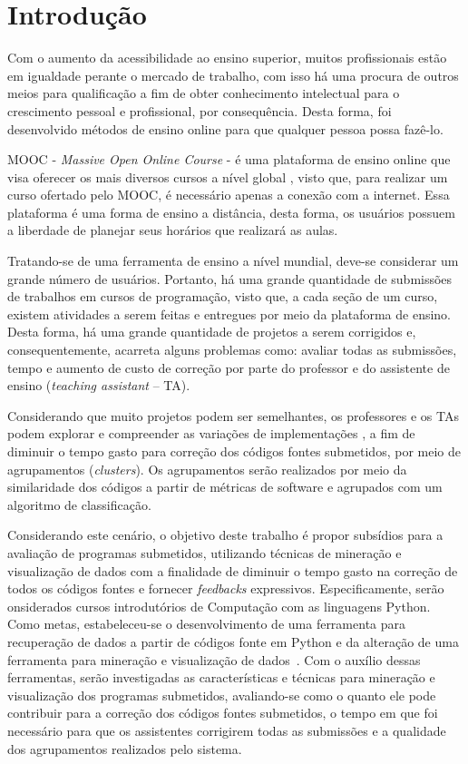 \chapter{Introdução}
Com o aumento da acessibilidade ao ensino superior, muitos profissionais estão em
igualdade perante o mercado de trabalho, com isso há uma procura de outros meios
para qualificação a fim de obter conhecimento intelectual para o crescimento
pessoal e profissional, por consequência. Desta forma, foi desenvolvido métodos
de ensino online para que qualquer pessoa possa fazê-lo.

MOOC - \textit{Massive Open Online Course} - é uma plataforma de ensino online
que visa oferecer os mais diversos cursos a nível global \cite{Mehlenbacher:2012},
visto que, para realizar um curso ofertado pelo MOOC, é necessário apenas a conexão
com a internet. Essa plataforma é uma forma de ensino a distância, desta forma,
os usuários possuem a liberdade de planejar seus horários que realizará as aulas. 

Tratando-se de uma ferramenta de ensino a nível mundial, deve-se considerar um
grande número de usuários. Portanto, há uma grande quantidade de submissões de
trabalhos em cursos de programação, visto que, a cada seção de um curso, existem
atividades a serem feitas e entregues por meio da plataforma de ensino. Desta
forma, há uma grande quantidade de projetos a serem corrigidos e, consequentemente,
acarreta alguns problemas como: avaliar todas as submissões, tempo e aumento de
custo de correção por parte do professor e do assistente de ensino
(\textit{teaching assistant} – TA).



Considerando que muito projetos podem ser semelhantes, os professores e os TAs
podem explorar e compreender as variações de implementações \cite{Yin:2015}, a
fim de diminuir o tempo gasto para correção dos códigos fontes submetidos, por
meio de agrupamentos (\textit{clusters}). Os agrupamentos serão realizados por
meio da similaridade dos códigos a partir de métricas de software e agrupados
com um algoritmo de classificação.

Considerando este cenário, o objetivo deste trabalho é propor subsídios para a
avaliação de programas submetidos, utilizando técnicas de mineração e visualização
de dados com a finalidade de diminuir o tempo gasto na correção de todos os códigos
fontes e  fornecer \textit{feedbacks} expressivos. Especificamente, serão
onsiderados cursos introdutórios de Computação com as linguagens Python. Como
metas, estabeleceu-se o desenvolvimento de uma ferramenta para recuperação de
dados a partir de códigos fonte em Python e da alteração de uma ferramenta para
mineração e visualização de dados~\cite{Alencar}. Com o auxílio dessas ferramentas,
serão investigadas as características e técnicas para mineração e visualização
dos programas submetidos, avaliando-se como o quanto ele pode contribuir para
a correção dos códigos fontes submetidos, o tempo em que foi necessário para
que os assistentes corrigirem todas as submissões e a qualidade dos agrupamentos
realizados pelo sistema.

